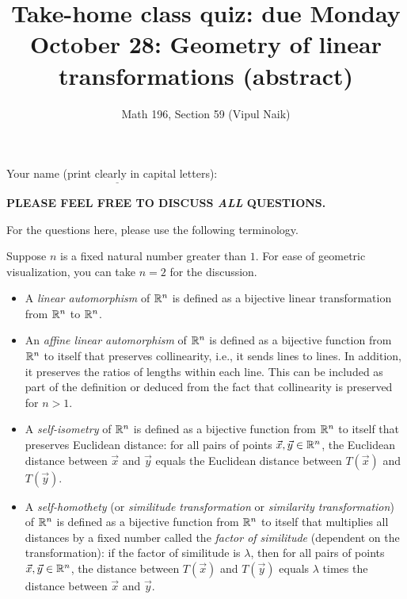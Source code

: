 \documentclass[10pt]{amsart}
\title{Take-home class quiz: due Monday October 28: Geometry of linear transformations (abstract)}
\author{Math 196, Section 59 (Vipul Naik)}
\begin{document}
\maketitle

Your name (print clearly in capital letters): $\underline{\qquad\qquad\qquad\qquad\qquad\qquad\qquad\qquad\qquad\qquad}$

{\bf PLEASE FEEL FREE TO DISCUSS {\em ALL} QUESTIONS.}

For the questions here, please use the following terminology.

Suppose $n$ is a fixed natural number greater than $1$. For ease of
geometric visualization, you can take $n = 2$ for the discussion.

\begin{itemize}
\item A {\em linear automorphism} of $\mathbb{R}^n$ is defined as
  a bijective linear transformation from $\mathbb{R}^n$ to $\mathbb{R}^n$.
\item An {\em affine linear automorphism} of $\mathbb{R}^n$ is defined as a
  bijective function from $\mathbb{R}^n$ to itself that preserves
  collinearity, i.e., it sends lines to lines. In addition, it
  preserves the ratios of lengths within each line. This can be
  included as part of the definition or deduced from the fact that
  collinearity is preserved for $n > 1$.
\item A {\em self-isometry} of $\mathbb{R}^n$ is defined as a bijective
  function from $\mathbb{R}^n$ to itself that preserves Euclidean distance:
  for all pairs of points $\vec{x},\vec{y} \in \mathbb{R}^n$, the Euclidean
  distance between $\vec{x}$ and $\vec{y}$ equals the Euclidean
  distance between $T(\vec{x})$ and $T(\vec{y})$.
\item A {\em self-homothety} (or {\em similitude transformation} or
  {\em similarity transformation}) of $\mathbb{R}^n$ is defined as a bijective
  function from $\mathbb{R}^n$ to itself that multiplies all distances by a
  fixed number called the {\em factor of similitude} (dependent on the
  transformation): if the factor of similitude is $\lambda$, then for
  all pairs of points $\vec{x},\vec{y} \in \mathbb{R}^n$, the distance between
  $T(\vec{x})$ and $T(\vec{y})$ equals $\lambda$ times the distance
  between $\vec{x}$ and $\vec{y}$.
\end{itemize}
\end{document}

